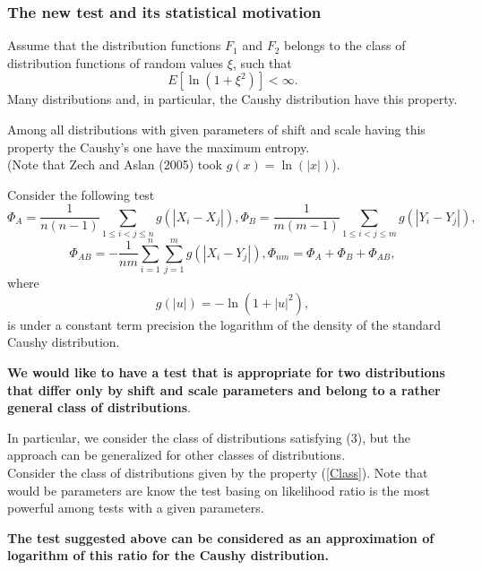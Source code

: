 \documentclass[slidestop,usepdftitle=false]{beamer}
\begin{document}
\begin{slide}
\frametitle{The new test and its statistical motivation}

Assume that the distribution functions
$F_1$ and $F_2$ belongs to the class of distribution functions of random values  $\xi$, such that
\begin {equation}\label{Class}
E [\ln (1+ \xi^2)     ] < \infty.
\end{equation}
Many distributions and, in particular, the Caushy distribution have this property.
 \bigskip

Among all distributions with given parameters of shift and scale having this property the Caushy's one have the maximum entropy.\\
(Note that Zech and Aslan (2005) took $g(x)=\ln(|x|)$).

\end{slide}
\begin{slide}
Consider the following test
\begin{equation}
 \Phi_{A}=\frac{1}{n(n-1)}\sum_{1\leq i<j\leq n} g(|X_i-X_j|),
\Phi_{B}=\frac{1}{m(m-1)}\sum_{1\leq i<j\leq m} g(|Y_i-Y_j|),
\end{equation}
\begin{equation}\label{K1}
\Phi_{AB}=-\frac{1}{nm}\sum_{i=1}^n\sum_{j=1}^m g(|X_i-Y_j|),
\Phi_{nm}=\Phi_{A}+ \Phi_{B}+ \Phi_{AB},
\end{equation}
where
$$
g(|u|)= -\ln (1+|u|^2),
$$
is under a constant term precision the logarithm of the density of the standard Caushy distribution.
\end{slide}
\begin{slide}

{\bf We would like to have a test that is appropriate for two distributions that differ only by shift and scale parameters and belong to a rather general class of distributions}.
\bigskip

In particular, we consider the class of distributions satisfying (3), but the approach can be generalized for other classes of distributions.\\
\bigskip
Consider the class of distributions given by the property (\ref{Class}).  Note that would be parameters are know the test basing on likelihood ratio is the most powerful among tests with a given parameters.

\bigskip
{\bf The test suggested above can be considered as an approximation of logarithm of this ratio for the Caushy distribution.}






\end{slide}
\end{document}
